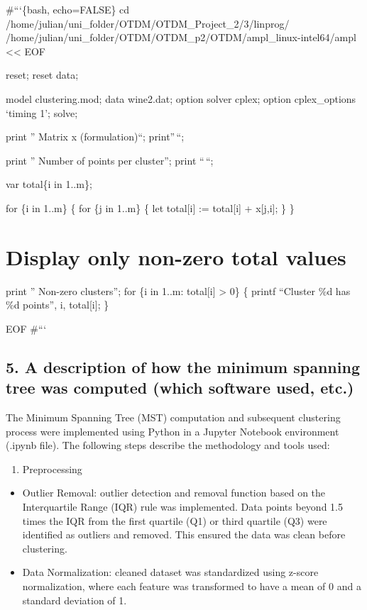 \documentclass[
]{article}
\providecommand{\tightlist}{%
  \setlength{\itemsep}{0pt}\setlength{\parskip}{0pt}}
\begin{document}
\#```\{bash, echo=FALSE\} cd
/home/julian/uni\_folder/OTDM/OTDM\_Project\_2/3/linprog/
/home/julian/uni\_folder/OTDM/OTDM\_p2/OTDM/ampl\_linux-intel64/ampl
\textless\textless{} EOF

reset; reset data;

model clustering.mod; data wine2.dat; option solver cplex; option
cplex\_options `timing 1'; solve;

print '' Matrix x (formulation)``; print''\,``;

print '' Number of points per cluster''; print ``\,``;

var total\{i in 1..m\};

for \{i in 1..m\} \{ for \{j in 1..m\} \{ let total{[}i{]} :=
total{[}i{]} + x{[}j,i{]}; \} \}

\section{Display only non-zero total
values}\label{display-only-non-zero-total-values}

print '' Non-zero clusters''; for \{i in 1..m: total{[}i{]}
\textgreater{} 0\} \{ printf ``Cluster \%d has \%d points\n'', i,
total{[}i{]}; \}

EOF \#```

\subsection{5. A description of how the minimum spanning tree was
computed (which software used,
etc.)}\label{a-description-of-how-the-minimum-spanning-tree-was-computed-which-software-used-etc.}

The Minimum Spanning Tree (MST) computation and subsequent clustering
process were implemented using Python in a Jupyter Notebook environment
(.ipynb file). The following steps describe the methodology and tools
used:

\begin{enumerate}
\def\labelenumi{\arabic{enumi}.}
\tightlist
\item
  Preprocessing
\end{enumerate}

\begin{itemize}
\tightlist
\item
  Outlier Removal: outlier detection and removal function based on the
  Interquartile Range (IQR) rule was implemented. Data points beyond 1.5
  times the IQR from the first quartile (Q1) or third quartile (Q3) were
  identified as outliers and removed. This ensured the data was clean
  before clustering.
\item
  Data Normalization: cleaned dataset was standardized using z-score
  normalization, where each feature was transformed to have a mean of 0
  and a standard deviation of 1.
\end{itemize}
\end{document}
